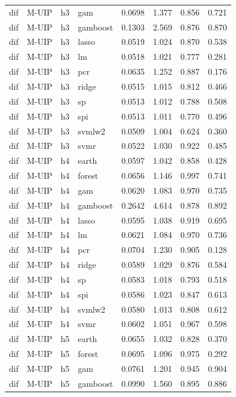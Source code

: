 \begin{ThreePartTable}
\begin{longtable}[t]{llclcccc}
dif & M-UIP & h3 & gam & 0.0698 & 1.377 & 0.856 & 0.721\\
dif & M-UIP & h3 & gamboost & 0.1303 & 2.569 & 0.876 & 0.870\\
dif & M-UIP & h3 & lasso & 0.0519 & 1.024 & 0.870 & 0.538\\
dif & M-UIP & h3 & lm & 0.0518 & 1.021 & 0.777 & 0.281\\
dif & M-UIP & h3 & pcr & 0.0635 & 1.252 & 0.887 & 0.176\\
dif & M-UIP & h3 & ridge & 0.0515 & 1.015 & 0.812 & 0.466\\
dif & M-UIP & h3 & sp & 0.0513 & 1.012 & 0.788 & 0.508\\
dif & M-UIP & h3 & spi & 0.0513 & 1.011 & 0.770 & 0.496\\
dif & M-UIP & h3 & svmlw2 & 0.0509 & 1.004 & 0.624 & 0.360\\
dif & M-UIP & h3 & svmr & 0.0522 & 1.030 & 0.922 & 0.485\\
\addlinespace
dif & M-UIP & h4 & earth & 0.0597 & 1.042 & 0.858 & 0.428\\
dif & M-UIP & h4 & forest & 0.0656 & 1.146 & 0.997 & 0.741\\
dif & M-UIP & h4 & gam & 0.0620 & 1.083 & 0.970 & 0.735\\
dif & M-UIP & h4 & gamboost & 0.2642 & 4.614 & 0.878 & 0.892\\
dif & M-UIP & h4 & lasso & 0.0595 & 1.038 & 0.919 & 0.695\\
dif & M-UIP & h4 & lm & 0.0621 & 1.084 & 0.970 & 0.736\\
dif & M-UIP & h4 & pcr & 0.0704 & 1.230 & 0.905 & 0.128\\
dif & M-UIP & h4 & ridge & 0.0589 & 1.029 & 0.876 & 0.584\\
dif & M-UIP & h4 & sp & 0.0583 & 1.018 & 0.793 & 0.518\\
dif & M-UIP & h4 & spi & 0.0586 & 1.023 & 0.847 & 0.613\\
dif & M-UIP & h4 & svmlw2 & 0.0580 & 1.013 & 0.808 & 0.612\\
dif & M-UIP & h4 & svmr & 0.0602 & 1.051 & 0.967 & 0.598\\
\addlinespace
dif & M-UIP & h5 & earth & 0.0655 & 1.032 & 0.828 & 0.370\\
dif & M-UIP & h5 & forest & 0.0695 & 1.096 & 0.975 & 0.292\\
dif & M-UIP & h5 & gam & 0.0761 & 1.201 & 0.945 & 0.904\\
dif & M-UIP & h5 & gamboost & 0.0990 & 1.560 & 0.895 & 0.886\\

\end{longtable}
\end{ThreePartTable}
